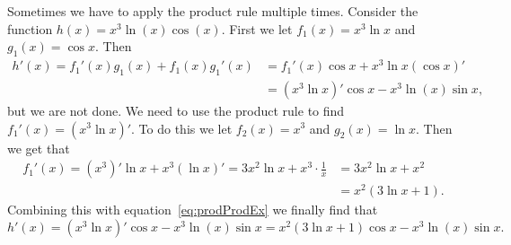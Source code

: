 \documentclass[main.tex]{subfiles}
\begin{document}
\begin{example}
Sometimes we have to apply the product rule multiple times. Consider the function $h(x) = x^3 \ln (x) \cos (x)$. First we let $f_1(x) = x^3 \ln x$ and $g_1(x) = \cos x$. Then
\begin{align}
h'(x) = f_1'(x) g_1(x) + f_1(x) g_1'(x) &= f_1'(x) \cos x + x^3 \ln x \left( \cos x \right)' \nonumber \\
&= \left(x^3 \ln x \right)' \cos x - x^3 \ln (x) \sin x, \label{eq:prodProdEx}
\end{align}
but we are not done. We need to use the product rule to find $f_1'(x) = \left( x^3 \ln x \right)'$. To do this we let $f_2(x) = x^3$ and $g_2(x) = \ln x$. Then we get that
\begin{align}
f_1'(x) = \left( x^3 \right)' \ln x + x^3 \left( \ln x \right)' = 3 x^2 \ln x + x^3 \cdot \frac{1}{x} &= 3 x^2 \ln x + x^2 \nonumber \\
&= x^2 \left( 3 \ln x + 1 \right).
\end{align}
Combining this with equation~\ref{eq:prodProdEx} we finally find that
\begin{equation}
h'(x) = \left(x^3 \ln x \right)' \cos x - x^3 \ln (x) \sin x = x^2 \left( 3 \ln x + 1 \right) \cos x - x^3 \ln (x) \sin x.
\end{equation}
\end{example}
\end{document}
